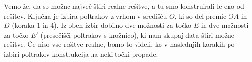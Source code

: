 \begin{opomba}
    Vemo že, da so možne največ štiri realne rešitve, a tu smo konstruirali le eno od rešitev. Ključna je izbira poltrakov z vrhom v središču $O$, ki so del premic $OA$ in $D$ (koraka $1$ in $4$). Iz obeh izbir dobimo dve možnosti za točko $E$ in dve možnosti za točko $E'$ (presečišči poltrakov s krožnico), ki nam skupaj data štiri možne rešitve. Če niso vse rešitve realne, bomo to videli, ko v naslednjih korakih po izbiri poltrakov konstrukcija na neki točki propade.
\end{opomba}